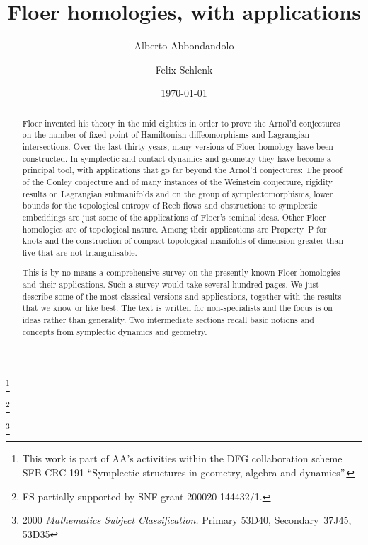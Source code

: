 \documentclass[12pt,twoside]{amsart}
\theoremstyle{plain}
\numberwithin{figure}{section}
\numberwithin{equation}{section}
\begin{document}
\title[Floer homologies]
{Floer homologies, with applications}

\author{Alberto Abbondandolo}
\thanks{This work is part of AA's activities within the DFG collaboration scheme SFB CRC 191 ``Symplectic structures in geometry, algebra and dynamics''.}
\address{Alberto Abbondandolo,
  Fakult\"at f\"ur Mathematik, 
  Ruhr-Universit\"at Bochum}

                                                    
\author{Felix Schlenk}  
\thanks{FS partially supported by SNF grant 200020-144432/1.}
\address{Felix Schlenk,
Institut de Math\'ematiques,
Universit\'e de Neuch\^atel}
%




\date{\today}
\thanks{2000 {\it Mathematics Subject Classification.}
Primary 53D40, Secondary~37J45, 53D35}


\begin{abstract}
Floer invented his theory in the mid eighties in order to prove the Arnol'd conjectures
on the number of fixed point of Hamiltonian diffeomorphisms and Lagrangian intersections. 
Over the last thirty years, many versions of Floer homology have been constructed. 
In symplectic and contact dynamics and geometry they have become a principal tool,
with applications that go far beyond the Arnol'd conjectures:
The proof of the Conley conjecture and of many instances of the Weinstein conjecture, 
rigidity results on Lagrangian submanifolds and on the group of symplectomorphisms, 
lower bounds for the topological entropy of Reeb flows and
obstructions to symplectic embeddings are just some of the applications of Floer's seminal ideas.
%
Other Floer homologies are of topological nature.
Among their applications are Property~P for knots
and the construction of compact topological manifolds of dimension greater than five 
that are not triangulisable.

This is by no means a comprehensive survey on the presently known Floer homologies and their applications. 
Such a survey would take several hundred pages. 
We just describe some of the most classical versions and applications, 
together with the results that we know or like best.
The text is written for non-specialists and the focus is on ideas rather than generality. 
Two intermediate sections recall basic notions and concepts from symplectic dynamics and geometry.
\end{abstract}

\maketitle
\tableofcontents
\end{document}
